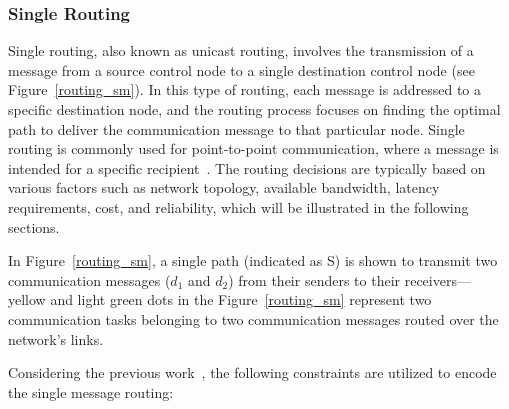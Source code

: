     \subsubsection{Single Routing}
    
    
    
    Single routing, also known as unicast routing, involves the transmission of a message from a source control node to a single destination control node (see Figure~\ref{routing_sm}).
    In this type of routing, each message is addressed to a specific destination node, and the routing process focuses on finding the optimal path to deliver the communication message to that particular node. Single routing is commonly used for point-to-point communication, where a message is intended for a specific recipient~\cite{9565115}.
    The routing decisions are typically based on various factors such as network topology, available bandwidth, latency requirements, cost, and reliability, which will be illustrated in the following sections. 
    
    In Figure~\ref{routing_sm}, a single path (indicated as S) is shown to transmit two communication messages ($d_1$ and $d_2$) from their senders to their receivers— yellow and light green dots in the Figure~\ref{routing_sm} represent two communication tasks belonging to two communication messages routed over the network's links. 
    
    Considering the previous work~\cite{9565115}, the following constraints are utilized to encode the single message routing:\newline
    
